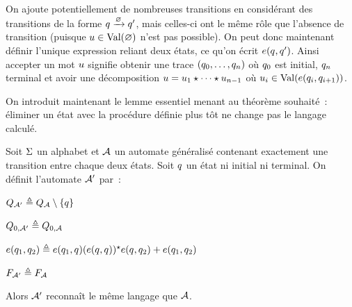 \begin{remark}
  On ajoute potentiellement de nombreuses transitions en considérant des
  transitions de la forme $q_{}\xrightarrow{\varnothing}q_{}'$, mais celles-ci ont le
  même rôle que l'absence de transition (puisque $u \in \operatorname{Val}(\varnothing)$ n'est
  pas possible). On peut donc maintenant définir l'unique expression reliant
  deux états, ce qu'on écrit $e(q_{},q_{}')$. Ainsi accepter un mot $u$
  signifie obtenir une trace $(q_{0},\ldots,q_{n})$ où $q_{0}$ est
  initial, $q_{n}$ terminal et avoir une décomposition
  $u = u_1\mathbin{\star} \cdots\mathbin{\star} u_{n-1}$ où
  $u_i \in \operatorname{Val}(e(q_{i},q_{i+1}))$.
\end{remark}

On introduit maintenant le lemme essentiel menant au théorème souhaité~:
éliminer un état avec la procédure définie plus tôt ne change pas le langage
calculé.

\begin{lemma}\label{lem.elim.state}
  Soit $\Sigma$ un alphabet et $\mathcal{A}$ un automate généralisé contenant
  exactement une transition entre chaque deux états. Soit $q_{}$ un état ni
  initial ni terminal. On définit l'automate $\mathcal{A}'$ par~:
  \vspace{0.1cm}
  \begin{itemize}
    \begin{minipage}{0.3\textwidth}
    \item $Q_{\mathcal{A}'} \triangleq Q_{\mathcal{A}} \setminus \{q\}$
    \item $Q_{0,\mathcal{A}'} \triangleq Q_{0,\mathcal{A}}$
    \end{minipage}
    \begin{minipage}{0.6\textwidth}
    \item $e(q_{1},q_{2}) \triangleq e(q_{1},q_{})
      (e(q_{},q_{}))^{\star} e(q_{},q_{2}) + e(q_{1},q_{2})$
    \item $F_{\mathcal{A}'} \triangleq F_{\mathcal{A}}$
    \end{minipage}
  \end{itemize}
  Alors $\mathcal{A}'$ reconnaît le même langage que $\mathcal{A}$.
\end{lemma}

